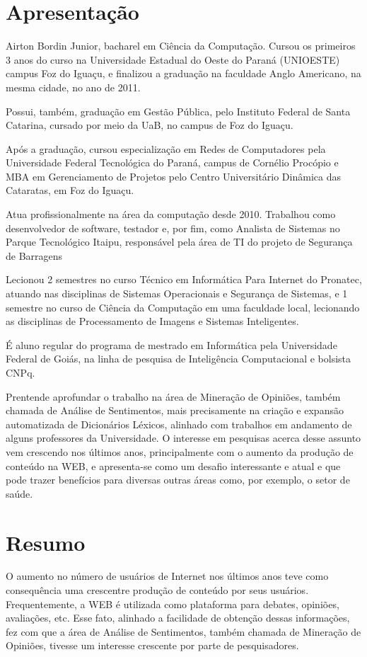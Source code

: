 \documentclass[a4paper,11pt]{article}
\begin{document}
\section{Apresentação}
Airton Bordin Junior, bacharel em Ciência da Computação. Cursou os primeiros 3 anos do curso na Universidade Estadual do Oeste do Paraná (UNIOESTE) campus Foz do Iguaçu, e finalizou a graduação na faculdade Anglo Americano, na mesma cidade, no ano de 2011.

Possui, também, graduação em Gestão Pública, pelo Instituto Federal de Santa Catarina, cursado por meio da UaB, no campus de Foz do Iguaçu.

Após a graduação, cursou especialização em Redes de Computadores pela Universidade Federal Tecnológica do Paraná, campus de Cornélio Procópio e MBA em Gerenciamento de Projetos pelo Centro Universitário Dinâmica das Cataratas, em Foz do Iguaçu.

Atua profissionalmente na área da computação desde 2010. Trabalhou como desenvolvedor de software, testador e, por fim, como Analista de Sistemas no Parque Tecnológico Itaipu, responsável pela área de TI do projeto de Segurança de Barragens

Lecionou 2 semestres no curso Técnico em Informática Para Internet do Pronatec, atuando nas disciplinas de Sistemas Operacionais e Segurança de Sistemas, e 1 semestre no curso de Ciência da Computação em uma faculdade local, lecionando as disciplinas de Processamento de Imagens e Sistemas Inteligentes.

É aluno regular do programa de mestrado em Informática pela Universidade Federal de Goiás, na linha de pesquisa de Inteligência Computacional e bolsista CNPq.

Prentende aprofundar o trabalho na área de Mineração de Opiniões, também chamada de Análise de Sentimentos, mais precisamente na criação e expansão automatizada de Dicionários Léxicos, alinhado com trabalhos em andamento de alguns professores da Universidade. O interesse em pesquisas acerca desse assunto vem crescendo nos últimos anos, principalmente com o aumento da produção de conteúdo na WEB, e apresenta-se como um desafio interessante e atual e que pode trazer benefícios para diversas outras áreas como, por exemplo, o setor de saúde.

\section{Resumo}
O aumento no número de usuários de Internet nos últimos anos teve como consequência uma crescentre produção de conteúdo por seus usuários. Frequentemente, a WEB é utilizada como plataforma para debates, opiniões, avaliações, etc. Esse fato, alinhado a facilidade de obtenção dessas informações, fez com que a área de Análise de Sentimentos, também chamada de Mineração de Opiniões, tivesse um interesse crescente por parte de pesquisadores. 
\end{document}
